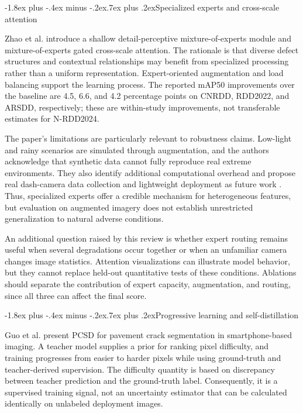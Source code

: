 \documentclass[11pt,a4paper]{article}
\makeatletter
\renewcommand\subsection{\@startsection{subsection}{2}{\z@}%
  {-1.8ex plus -.4ex minus -.2ex}{.7ex plus .2ex}{\normalfont\normalsize\bfseries}}
\makeatother
\begin{document}
\subsection{Specialized experts and cross-scale attention}

Zhao et al. \cite{r4} introduce a shallow detail-perceptive mixture-of-experts module and mixture-of-experts gated cross-scale attention. The rationale is that diverse defect structures and contextual relationships may benefit from specialized processing rather than a uniform representation. Expert-oriented augmentation and load balancing support the learning process. The reported mAP50 improvements over the baseline are 4.5, 6.6, and 4.2 percentage points on CNRDD, RDD2022, and ARSDD, respectively; these are within-study improvements, not transferable estimates for N-RDD2024.

The paper's limitations are particularly relevant to robustness claims. Low-light and rainy scenarios are simulated through augmentation, and the authors acknowledge that synthetic data cannot fully reproduce real extreme environments. They also identify additional computational overhead and propose real dash-camera data collection and lightweight deployment as future work \cite{r4}. Thus, specialized experts offer a credible mechanism for heterogeneous features, but evaluation on augmented imagery does not establish unrestricted generalization to natural adverse conditions.

An additional question raised by this review is whether expert routing remains useful when several degradations occur together or when an unfamiliar camera changes image statistics. Attention visualizations can illustrate model behavior, but they cannot replace held-out quantitative tests of these conditions. Ablations should separate the contribution of expert capacity, augmentation, and routing, since all three can affect the final score.

\subsection{Progressive learning and self-distillation}

Guo et al. \cite{r5} present PCSD for pavement crack segmentation in smartphone-based imaging. A teacher model supplies a prior for ranking pixel difficulty, and training progresses from easier to harder pixels while using ground-truth and teacher-derived supervision. The difficulty quantity is based on discrepancy between teacher prediction and the ground-truth label. Consequently, it is a supervised training signal, not an uncertainty estimator that can be calculated identically on unlabeled deployment images.
\end{document}
